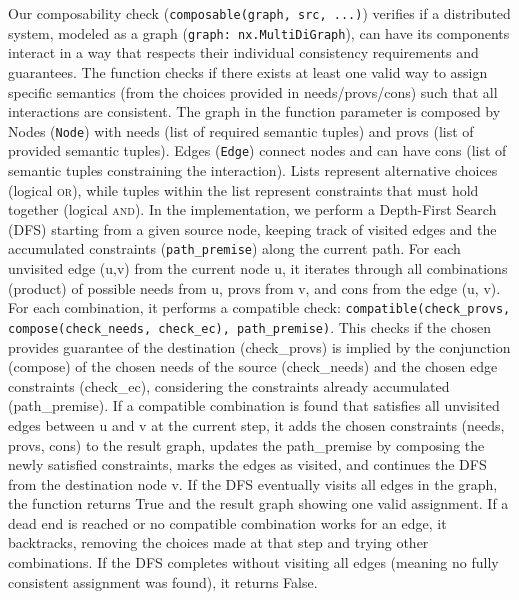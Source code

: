 Our composability check (\texttt{composable(graph, src, ...)})
verifies if a distributed system, modeled as a graph (\texttt{graph:
nx.MultiDiGraph}), can have its components interact in a way that
respects their individual consistency requirements and guarantees.
The function checks if there exists at least one valid way to assign
specific semantics (from the choices provided in needs/provs/cons)
such that all interactions are consistent. The graph in the function
parameter is composed by Nodes (\texttt{Node}) with needs (list of
required semantic tuples) and provs (list of provided semantic
tuples). Edges (\texttt{Edge}) connect nodes and can have cons (list
of semantic tuples constraining the interaction). Lists represent
alternative choices (logical \textsc{or}), while tuples within the list
represent constraints that must hold together (logical \textsc{and}). In the
implementation, we perform a Depth-First Search (DFS) starting from a
given source node, keeping track of visited edges and the accumulated
constraints (\texttt{path\_premise}) along the current path. For each
unvisited edge (u,v) from the current node u, it iterates through all
combinations (product) of possible needs from u, provs from v, and
cons from the edge (u, v). For each combination, it performs a
compatible check: \texttt{compatible(check\_provs,
compose(check\_needs, check\_ec), path\_premise)}. This checks if the
chosen provides guarantee of the destination (check\_provs) is
implied by the conjunction (compose) of the chosen needs of the
source (check\_needs) and the chosen edge constraints (check\_ec),
considering the constraints already accumulated (path\_premise). If a
compatible combination is found that satisfies all unvisited edges
between u and v at the current step, it adds the chosen constraints
(needs, provs, cons) to the result graph, updates the path\_premise
by composing the newly satisfied constraints, marks the edges as
visited, and continues the DFS from the destination node v. If the
DFS eventually visits all edges in the graph, the function returns
True and the result graph showing one valid assignment. If a dead end
is reached or no compatible combination works for an edge, it
backtracks, removing the choices made at that step and trying other
combinations. If the DFS completes without visiting all edges
(meaning no fully consistent assignment was found), it returns False.

